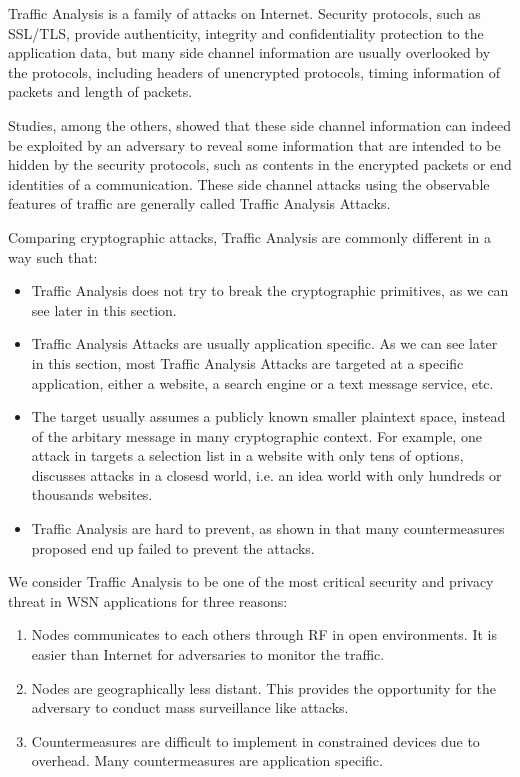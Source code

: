 Traffic Analysis is a family of attacks on Internet. Security protocols, such as SSL/TLS,  provide authenticity, integrity and confidentiality protection to the application data, but many side channel information are usually overlooked by the protocols, including headers of unencrypted protocols, timing information of packets and length of packets. 

Studies, \cite{WebSideChannel}\cite{PinpointWeb}\cite{Peekaboo} among the others, showed that these side channel information can indeed be exploited by an adversary to reveal some information that are intended to be hidden by the security protocols, such as contents in the encrypted packets or end identities of a communication. These side channel attacks using the observable features of traffic are generally called Traffic Analysis Attacks.

Comparing cryptographic attacks, Traffic Analysis are commonly different in a way such that:
\begin{itemize}
	\item Traffic Analysis does not try to break the cryptographic primitives, as we can see later in this section. 
	\item Traffic Analysis Attacks are usually application specific. As we can see later in this section, most Traffic Analysis Attacks are targeted at a specific application, either a website, a search engine or a text message service, etc.
	\item The target usually assumes a publicly known smaller plaintext space, instead of the arbitary message in many cryptographic context. For example, one attack in \cite{WebSideChannel} targets a selection list in a website with only tens of options,  \cite{Peekaboo} discusses attacks in a closesd world, i.e. an idea world with only hundreds or thousands websites.
	\item Traffic Analysis are hard to prevent, as shown in \cite{Peekaboo} that many countermeasures proposed end up failed to prevent the attacks.
\end{itemize}

We consider Traffic Analysis to be one of the most critical security and privacy threat in WSN applications for three reasons:
\begin{enumerate}
	\item Nodes communicates to each others through RF in open environments. It is easier than Internet for adversaries to monitor the traffic.
	\item Nodes are geographically less distant. This provides the opportunity for the adversary to conduct mass surveillance like attacks.
	\item Countermeasures are difficult to implement in constrained devices due to overhead. Many countermeasures are application specific.
\end{enumerate} 

